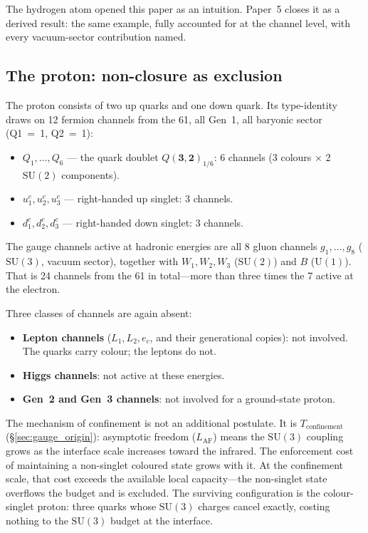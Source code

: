 \documentclass[11pt]{article}
\newenvironment{varlist}{\begin{itemize}[nosep,leftmargin=2em]}{\end{itemize}}
\newcommand{\SU}{\mathrm{SU}}
\newcommand{\U}{\mathrm{U}}
\begin{document}
The hydrogen atom opened this paper as an intuition.  Paper~5 closes it
as a derived result: the same example, fully accounted for at the channel
level, with every vacuum-sector contribution named.

\subsection*{The proton: non-closure as exclusion}

The proton consists of two up quarks and one down quark.  Its
type-identity draws on 12 fermion channels from the 61, all Gen~1, all
baryonic sector (Q1~=~1, Q2~=~1):

\begin{varlist}
\item $Q_1,\ldots,Q_6$ --- the quark doublet $Q(\mathbf{3},\mathbf{2})_{1/6}$: 6 channels
(3 colours $\times$ 2 $\SU(2)$ components).
\item $u^c_1, u^c_2, u^c_3$ --- right-handed up singlet: 3 channels.
\item $d^c_1, d^c_2, d^c_3$ --- right-handed down singlet: 3 channels.
\end{varlist}

The gauge channels active at hadronic energies are all 8 gluon channels
$g_1,\ldots,g_8$ ($\SU(3)$, vacuum sector), together with $W_1, W_2,
W_3$ ($\SU(2)$) and $B$ ($\U(1)$).  That is 24 channels from the 61 in
total---more than three times the 7 active at the electron.

Three classes of channels are again absent:
\begin{varlist}
\item \textbf{Lepton channels} ($L_1, L_2, e_c$, and their generational
copies): not involved.  The quarks carry colour; the leptons do not.
\item \textbf{Higgs channels}: not active at these energies.
\item \textbf{Gen~2 and Gen~3 channels}: not involved for a
ground-state proton.
\end{varlist}

The mechanism of confinement is not an additional postulate.  It is
$T_{\mathrm{confinement}}$ (\S\ref{sec:gauge_origin}): asymptotic freedom
($L_{\mathrm{AF}}$) means the $\SU(3)$ coupling grows as the interface
scale increases toward the infrared.  The enforcement cost of maintaining
a non-singlet coloured state grows with it.  At the confinement scale, that
cost exceeds the available local capacity---the non-singlet state overflows
the budget and is excluded.  The surviving configuration is the
colour-singlet proton: three quarks whose $\SU(3)$ charges cancel exactly,
costing nothing to the $\SU(3)$ budget at the interface.
\end{document}
